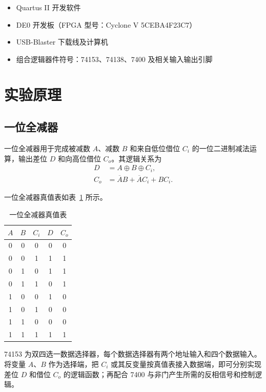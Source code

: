 \documentclass{ctexrep}
\begin{document}
\begin{itemize}
    \item Quartus II 开发软件
    \item DE0 开发板（FPGA 型号：Cyclone V 5CEBA4F23C7）
    \item USB-Blaster 下载线及计算机
    \item 组合逻辑器件符号：74153、74138、7400 及相关输入输出引脚
\end{itemize}

\section{实验原理}

\subsection{一位全减器}

一位全减器用于完成被减数 $A$、减数 $B$ 和来自低位借位 $C_i$ 的一位二进制减法运算，输出差位 $D$ 和向高位借位 $C_o$。其逻辑关系为
\begin{align}
    D &= A \oplus B \oplus C_i, \\
    C_o &= \overline{A}B + \overline{A}C_i + BC_i.
\end{align}

一位全减器真值表如表~\ref{e2:tab:sub_truth} 所示。

\begin{table}[H]
    \centering
    \caption{一位全减器真值表}
    \label{e2:tab:sub_truth}
    \begin{tabular}{ccc|cc}
        \toprule
        $A$ & $B$ & $C_i$ & $D$ & $C_o$ \\
        \midrule
        0 & 0 & 0 & 0 & 0 \\
        0 & 0 & 1 & 1 & 1 \\
        0 & 1 & 0 & 1 & 1 \\
        0 & 1 & 1 & 0 & 1 \\
        1 & 0 & 0 & 1 & 0 \\
        1 & 0 & 1 & 0 & 0 \\
        1 & 1 & 0 & 0 & 0 \\
        1 & 1 & 1 & 1 & 1 \\
        \bottomrule
    \end{tabular}
\end{table}

74153 为双四选一数据选择器，每个数据选择器有两个地址输入和四个数据输入。将变量 $A$、$B$ 作为选择端，把 $C_i$ 或其反变量按真值表接入数据端，即可分别实现差位 $D$ 和借位 $C_o$ 的逻辑函数；再配合 7400 与非门产生所需的反相信号和控制逻辑。
\end{document}
